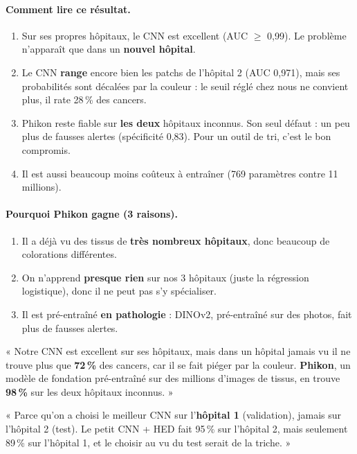 \documentclass[11pt,a4paper]{article}
\begin{document}
\paragraph{Comment lire ce résultat.}
\begin{enumerate}
  \item Sur ses propres hôpitaux, le CNN est excellent (AUC $\geq$ 0,99). Le problème n'apparaît que dans un \textbf{nouvel hôpital}.
  \item Le CNN \textbf{range} encore bien les patchs de l'hôpital 2 (AUC 0,971), mais ses probabilités sont décalées par la couleur :
        le seuil réglé chez nous ne convient plus, il rate 28\,\% des cancers.
  \item Phikon reste fiable sur \textbf{les deux} hôpitaux inconnus. Son seul défaut : un peu plus de fausses alertes (spécificité 0,83).
        Pour un outil de tri, c'est le bon compromis.
  \item Il est aussi beaucoup moins coûteux à entraîner (769 paramètres contre 11 millions).
\end{enumerate}

\paragraph{Pourquoi Phikon gagne (3 raisons).}
\begin{enumerate}
  \item Il a déjà vu des tissus de \textbf{très nombreux hôpitaux}, donc beaucoup de colorations différentes.
  \item On n'apprend \textbf{presque rien} sur nos 3 hôpitaux (juste la régression logistique), donc il ne peut pas s'y spécialiser.
  \item Il est pré-entraîné \textbf{en pathologie} : DINOv2, pré-entraîné sur des photos, fait plus de fausses alertes.
\end{enumerate}

\begin{oral}
« Notre CNN est excellent sur ses hôpitaux, mais dans un hôpital jamais vu il ne trouve plus que \textbf{72\,\%} des cancers, car il
se fait piéger par la couleur. \textbf{Phikon}, un modèle de fondation pré-entraîné sur des millions d'images de tissus, en trouve
\textbf{98\,\%} sur les deux hôpitaux inconnus. »
\end{oral}

\begin{piege}
« Parce qu'on a choisi le meilleur CNN sur l'\textbf{hôpital 1} (validation), jamais sur l'hôpital 2 (test). Le petit CNN + HED fait
95\,\% sur l'hôpital 2, mais seulement 89\,\% sur l'hôpital 1, et le choisir au vu du test serait de la triche. »
\end{piege}
\end{document}
